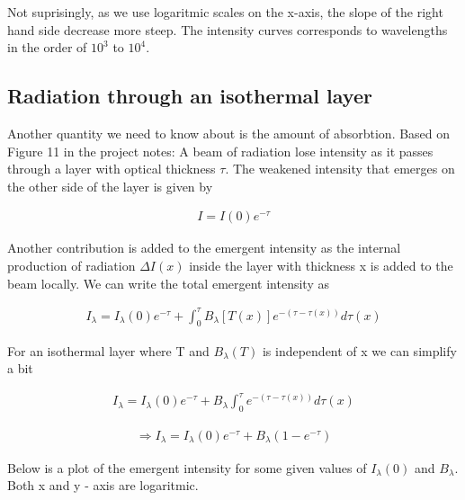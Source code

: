\documentclass[norsk,a4paper,12pt]{article}
\begin{document}
Not suprisingly, as we use logaritmic scales on the x-axis, the slope of the right hand side decrease more steep. 
The intensity curves corresponds to wavelengths in the order of $10^3 $ to $ 10^4$. 

\subsection{Radiation through an isothermal layer}
Another quantity we need to know about is the amount of absorbtion. Based on Figure 11 in the project notes: 
A beam of radiation lose intensity as it 
passes through a layer with optical thickness $\tau $. The weakened intensity that emerges on the other side of 
the layer is given by

\begin{align*}
I = I(0)e^{-\tau}
\end{align*} 

Another contribution is added to the emergent intensity as the internal production of radiation $\Delta I(x)$
inside the layer with thickness x is added to the beam locally. We can write the total emergent intensity as

\begin{align*}
I_{\lambda} = I_{\lambda}(0)e^{-\tau} + \int_0^{\tau} B_{\lambda}[T(x)]e^{-(\tau-\tau(x))}d\tau(x)
\end{align*} 

For an isothermal layer where T and $B_{\lambda}(T) $ is independent of x we can simplify a bit

\begin{align*}
I_{\lambda} = I_{\lambda}(0)e^{-\tau} +  B_{\lambda}\int_0^{\tau}e^{-(\tau-\tau(x))}d\tau(x)
\end{align*} 

\begin{align*}
\Rightarrow I_{\lambda} = I_{\lambda}(0)e^{-\tau} +  B_{\lambda}(1-e^{-\tau})
\end{align*} 

Below is a plot of the emergent intensity for some given values of $I_{\lambda}(0) $ and $B_{\lambda} $. Both 
x and y - axis are logaritmic.
\end{document}

